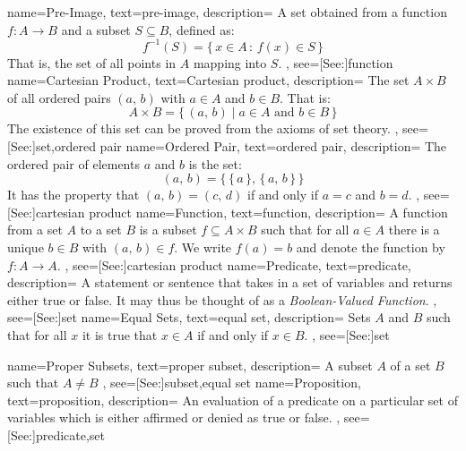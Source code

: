 {
    name={Pre-Image},
    text={pre-image},
    description={
        A set obtained from a function $f:A\rightarrow{B}$
        and a subset $S\subseteq{B}$, defined as:
        \begin{equation*}
            f^{\minus{1}}(S)=\{\,x\in{A}\,:\,f(x)\in{S}\,\}
        \end{equation*}
        That is, the set of all points in $A$ mapping into $S$.
    },
    see=[See:]{function}
}
{
    name={Cartesian Product},
    text={Cartesian product},
    description={
        The set $A\times{B}$ of all ordered pairs $(a,\,b)$ with
        $a\in{A}$ and $b\in{B}$. That is:
        \begin{equation*}
            A\times{B}=\{\,(a,\,b)\;|\;a\in{A}\textrm{ and }b\in{B}\,\}
        \end{equation*}
        The existence of this set can be proved from the axioms of set theory.
    },
    see=[See:]{set,ordered pair}
}
{
    name={Ordered Pair},
    text={ordered pair},
    description={
        The ordered pair of elements $a$ and $b$ is the set:
        \begin{equation}
            (a,\,b)=\big\{\,\{\,a\,\},\,\{\,a,\,b\,\}\,\big\}
        \end{equation}
        It has the property that $(a,\,b)=(c,\,d)$ if and only if $a=c$ and
        $b=d$.
    },
    see=[See:]{cartesian product}
}
{
    name={Function},
    text={function},
    description={
        A function from a set $A$ to a set $B$ is a subset
        $f\subseteq{A}\times{B}$ such that for all $a\in{A}$ there is a
        unique $b\in{B}$ with $(a,\,b)\in{f}$. We write $f(a)=b$ and denote
        the function by $f:A\rightarrow{A}$.
    },
    see=[See:]{cartesian product}
}
{
    name={Predicate},
    text={predicate},
    description={
        A statement or sentence that takes in a set of variables and returns
        either true or false. It may thus be thought of as a
        \textit{Boolean-Valued Function}.
    },
    see=[See:]{set}
}
{
    name={Equal Sets},
    text={equal set},
    description={
        Sets $A$ and $B$ such that for all $x$ it is true that
        $x\in{A}$ if and only if $x\in{B}$.
    },
    see=[See:]{set}
}

{
    name={Proper Subsets},
    text={proper subset},
    description={
        A subset $A$ of a set $B$ such that $A\ne{B}$
    },
    see=[See:]{subset,equal set}
}
{
    name={Proposition},
    text={proposition},
    description={
        An evaluation of a predicate on a particular set of variables which is
        either affirmed or denied as true or false.
    },
    see=[See:]{predicate,set}
}

